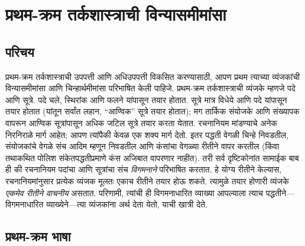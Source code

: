 \chapter{प्रथम-क्रम तर्कशास्त्राची विन्यासमीमांसा}\label{fol:syn::chap}









\section{परिचय}\label{fol:syn:itx:sec}

प्रथम-क्रम तर्कशास्त्राची उपपत्ती आणि अधिउपपत्ती विकसित करण्यासाठी,
आपण प्रथम त्याच्या व्यंजकांची विन्यासमीमांसा आणि चिन्हार्थमीमांसा
परिभाषित केली पाहिजे. प्रथम-क्रम तर्कशास्त्राची व्यंजके म्हणजे पदे आणि
सूत्रे. पदे चले, स्थिरांक आणि फलने
यांपासून तयार होतात. सूत्रे मात्र विधेये आणि पदे
यांपासून तयार होतात (यांतून सर्वांत लहान, ``आण्विक'' सूत्रे
तयार होतात); मग तार्किक संयोजके आणि संख्यापक वापरून आण्विक
सूत्रांपासून अधिक जटिल सूत्रे तयार करता येतात. रचनानियम
मांडण्याचे अनेक निरनिराळे मार्ग आहेत; आपण त्यांपैकी केवळ एक शक्य
मार्ग देतो. इतर पद्धती वेगळी चिन्हे निवडतील, संयोजकांचे वेगळे संच
आदिम म्हणून निवडतील आणि कंसांचा वेगळ्या रीतीने वापर करतील (किंवा
तथाकथित पोलिश संकेतपद्धतीप्रमाणे कंस अजिबात वापरणार नाहीत). तरी सर्व
दृष्टिकोनांत सामाईक बाब ही की रचनानियम पदांचा आणि सूत्रांचा
संच \emph{विगमनाने} परिभाषित करतात. हे योग्य रीतीने केल्यास,
रचनानियमांनुसार प्रत्येक व्यंजक मूलतः एकाच रीतीने तयार होऊ शकते.
त्यामुळे तयार होणारी व्यंजके \emph{एकमेव रीतीने वाचनीय} असतात. परिणामी,
त्यांची ही विगमनाधारित व्याख्या आपल्याला त्याच पद्धतीने---विगमनाधारित
व्याख्येने---त्या व्यंजकांना अर्थ देता येतो, याची खात्री देते.












\section{प्रथम-क्रम भाषा}\label{fol:syn:fol:sec}


